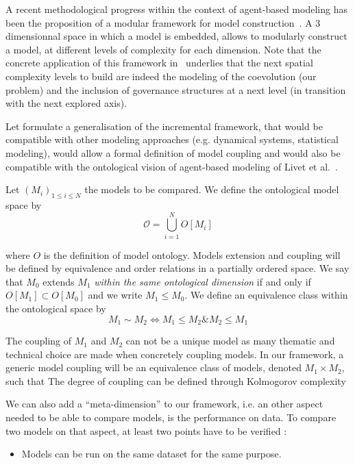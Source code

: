 A recent methodological progress within the context of agent-based modeling has been the proposition of a modular framework for model construction~\cite{cottineau2015incremental}. A 3 dimensionnal space in which a model is embedded, allows to modularly construct a model, at different levels of complexity for each dimension. Note that the concrete application of this framework in~\cite{cottineau2014evolution} underlies that the next spatial complexity levels to build are indeed the modeling of the coevolution (our problem) and the inclusion of governance structures at a next level (in transition with the next explored axis).

Let formulate a generalisation of the incremental framework, that would be compatible with other modeling approaches (e.g. dynamical systems, statistical modeling), would allow a formal definition of model coupling and would also be compatible with the ontological vision of agent-based modeling of Livet et al.~\cite{livet2010}.

Let $(M_i)_{1\leq i \leq N}$ the models to be compared. We define the ontological model space by
\[
\mathcal{O} = \bigcup_{i=1}^{N} O[M_i]
\]

where $O$ is the definition of model ontology.
Models extension and coupling will be defined by equivalence and order relations in a partially ordered space. We say that $M_0$ extends $M_1$ \emph{within the same ontological dimension} if and only if $O[M_1] \subset O[M_0]$ and we write $M_1 \leq M_0 $. We define an equivalence class within the ontological space by
\[
M_1 \sim M_2 \iff M_1 \leq M_2 \& M_2 \leq M_1  
\]


The coupling of $M_1$ and $M_2$ can not be a unique model as many thematic and technical choice are made when concretely coupling models. In our framework, a generic model coupling will be an equivalence class of models, denoted $M_1 \times M_2$, such that 
The degree of coupling can be defined through Kolmogorov complexity


We can also add a ``meta-dimension'' to our framework, i.e. an other aspect needed to be able to compare models, is the performance on data. To compare two models on that aspect, at least two points have to be verified :
\begin{itemize}
\item Models can be run on the same dataset for the same purpose.
\end{itemize}



